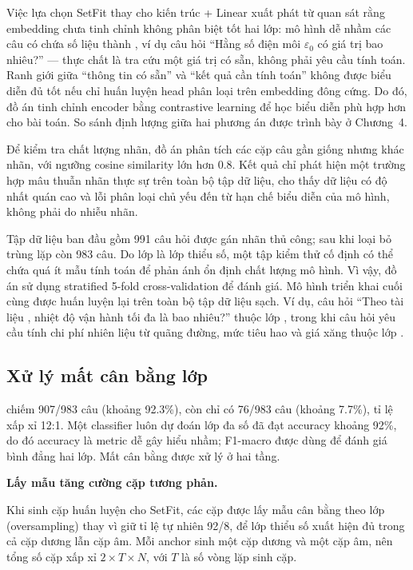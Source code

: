 \documentclass[../DoAn.tex]{subfiles}
\begin{document}
Việc lựa chọn SetFit thay cho kiến trúc \plaincode{[CLS]} + Linear xuất phát từ quan sát rằng embedding chưa tinh chỉnh không phân biệt tốt hai lớp: mô hình dễ nhầm các câu  có chứa số liệu thành , ví dụ câu hỏi ``Hằng số điện môi $\varepsilon_0$ có giá trị bao nhiêu?'' --- thực chất là tra cứu một giá trị có sẵn, không phải yêu cầu tính toán. Ranh giới giữa ``thông tin có sẵn'' và ``kết quả cần tính toán'' không được biểu diễn đủ tốt nếu chỉ huấn luyện head phân loại trên embedding đông cứng. Do đó, đồ án tinh chỉnh encoder bằng contrastive learning để học biểu diễn phù hợp hơn cho bài toán. So sánh định lượng giữa hai phương án được trình bày ở Chương~4.

Để kiểm tra chất lượng nhãn, đồ án phân tích các cặp câu gần giống nhưng khác nhãn, với ngưỡng cosine similarity lớn hơn 0.8. Kết quả chỉ phát hiện một trường hợp mâu thuẫn nhãn thực sự trên toàn bộ tập dữ liệu, cho thấy dữ liệu có độ nhất quán cao và lỗi phân loại chủ yếu đến từ hạn chế biểu diễn của mô hình, không phải do nhiễu nhãn.

Tập dữ liệu ban đầu gồm 991 câu hỏi được gán nhãn thủ công; sau khi loại bỏ trùng lặp còn 983 câu. Do lớp  là lớp thiểu số, một tập kiểm thử cố định có thể chứa quá ít mẫu tính toán để phản ánh ổn định chất lượng mô hình. Vì vậy, đồ án sử dụng stratified 5-fold cross-validation để đánh giá. Mô hình triển khai cuối cùng được huấn luyện lại trên toàn bộ tập dữ liệu sạch. Ví dụ, câu hỏi ``Theo tài liệu , nhiệt độ vận hành tối đa là bao nhiêu?'' thuộc lớp , trong khi câu hỏi yêu cầu tính chi phí nhiên liệu từ quãng đường, mức tiêu hao và giá xăng thuộc lớp .

\subsection{Xử lý mất cân bằng lớp}
\label{subsection:3.9.2}

 chiếm 907/983 câu (khoảng 92.3\%), còn  chỉ có 76/983 câu (khoảng 7.7\%), tỉ lệ xấp xỉ 12:1. Một classifier luôn dự đoán lớp đa số đã đạt accuracy khoảng 92\%, do đó accuracy là metric dễ gây hiểu nhầm; F1-macro được dùng để đánh giá bình đẳng hai lớp. Mất cân bằng được xử lý ở hai tầng.

\noindent\textbf{Lấy mẫu tăng cường cặp tương phản.}

Khi sinh cặp huấn luyện cho SetFit, các cặp được lấy mẫu cân bằng theo lớp (oversampling) thay vì giữ tỉ lệ tự nhiên 92/8, để lớp thiểu số xuất hiện đủ trong cả cặp dương lẫn cặp âm. Mỗi anchor sinh một cặp dương và một cặp âm, nên tổng số cặp xấp xỉ $2 \times T \times N$, với $T$ là số vòng lặp sinh cặp.
\end{document}
